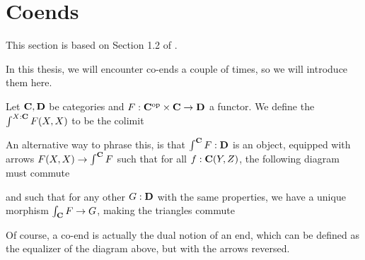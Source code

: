 \section{Coends}\label{sec:coends}
This section is based on Section 1.2 of \autocite{riehl}.

In this thesis, we will encounter co-ends a couple of times, so we will introduce them here.
\begin{definition}
  Let $ \mathbf{C}, \mathbf{D} $ be categories and $ F : \mathbf{C}^{\text{op}} \times \mathbf{C} \to \mathbf{D} $ a functor. We define the  $ \int^{X : \mathbf{C}} F(X, X) $ to be the colimit
  \begin{center}
  \end{center}
\end{definition}

\begin{remark}
  An alternative way to phrase this, is that $ \int^{\mathbf{C}} F : \mathbf{D} $ is an object, equipped with arrows $ F(X, X) \to \int^{\mathbf{C}} F $ such that for all $ f: \mathbf{C}(Y, Z) $, the following diagram must commute
  \begin{center}
  \end{center}
  and such that for any other $ G : \mathbf{D} $ with the same properties, we have a unique morphism $ \int_{\mathbf{C}} F \to G $, making the triangles commute
  \begin{center}
  \end{center}
\end{remark}

\begin{remark}
  Of course, a co-end is actually the dual notion of an end, which can be defined as the equalizer of the diagram above, but with the arrows reversed.
\end{remark}

